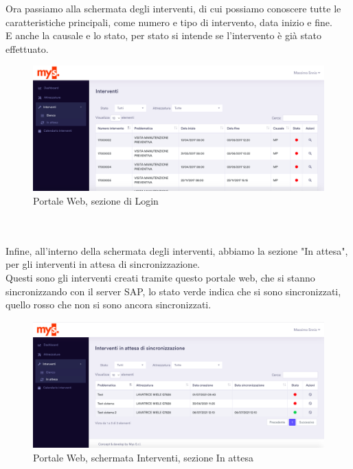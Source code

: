 Ora passiamo alla schermata degli interventi, di cui possiamo conoscere tutte le caratteristiche principali, come numero e tipo di intervento, data inizio e fine.\\
E anche la causale e lo stato, per stato si intende se l'intervento è già stato effettuato.
\begin{figure}[!h] 
	\centering 
	\includegraphics[scale = 0.25]{immagini/portale/interventi.png} 
	\caption {Portale Web, sezione di Login}
\end{figure}
\\\\Infine, all'interno della schermata degli interventi, abbiamo la sezione "In attesa", per gli interventi in attesa di sincronizzazione.\\
Questi sono gli interventi creati tramite questo portale web, che si stanno sincronizzando con il server SAP, lo stato verde indica che si sono sincronizzati, quello rosso che non si sono ancora sincronizzati.
\begin{figure}[!h] 
	\centering 
	\includegraphics[scale = 0.25]{immagini/portale/interventi-in-attesa.png} 
	\caption {Portale Web, schermata Interventi, sezione In attesa}
\end{figure}
\pagebreak

